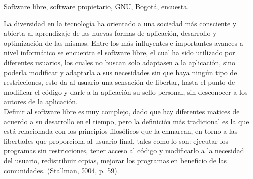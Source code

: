 \begin{multicols}{2}



 Software libre, software propietario, GNU, Bogotá, encuesta.


La diversidad en la tecnología ha orientado a una sociedad más consciente y abierta al aprendizaje de las nuevas formas de aplicación, desarrollo y optimización de las mismas. Entre los más influyentes e importantes avances a nivel informático se encuentra el software libre, el cual ha sido utilizado por diferentes usuarios, los cuales no buscan solo adaptasen a la aplicación, sino poderla modificar y adaptarla a sus necesidades sin que haya ningún tipo de restricciones, esto da al usuario una sensación de libertar, hasta el punto de modificar el código y darle a la aplicación su sello personal, sin desconocer a los autores de la aplicación. \\

Definir al software libre es muy complejo, dado que hay diferentes matices de acuerdo a su desarrollo en el tiempo, pero la definición más tradicional es la que está relacionada con los principios filosóficos que la enmarcan, en torno a las libertades que proporciona al usuario final, tales como lo son: ejecutar los programas sin restricciones, tener acceso al código y modificarlo a la necesidad del usuario, redistribuir copias, mejorar los programas en beneficio de las comunidades. (Stallman, 2004, p. 59).\\


\end{multicols}
